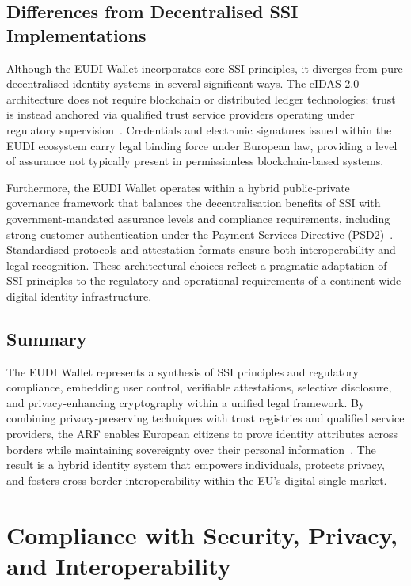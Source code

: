 \documentclass[sigconf,balance,nonacm,authordraft]{acmart}
\begin{document}
\subsection{Differences from Decentralised SSI Implementations}

Although the EUDI Wallet incorporates core SSI principles, it diverges from pure decentralised identity systems in several significant ways. The eIDAS 2.0 architecture does not require blockchain or distributed ledger technologies; trust is instead anchored via qualified trust service providers operating under regulatory supervision~\cite{Finextra_SSI_Differences}. Credentials and electronic signatures issued within the EUDI ecosystem carry legal binding force under European law, providing a level of assurance not typically present in permissionless blockchain-based systems.

Furthermore, the EUDI Wallet operates within a hybrid public-private governance framework that balances the decentralisation benefits of SSI with government-mandated assurance levels and compliance requirements, including strong customer authentication under the Payment Services Directive (PSD2)~\cite{Finextra_SSI_Differences}. Standardised protocols and attestation formats ensure both interoperability and legal recognition. These architectural choices reflect a pragmatic adaptation of SSI principles to the regulatory and operational requirements of a continent-wide digital identity infrastructure.

\subsection{Summary}

The EUDI Wallet represents a synthesis of SSI principles and regulatory compliance, embedding user control, verifiable attestations, selective disclosure, and privacy-enhancing cryptography within a unified legal framework. By combining privacy-preserving techniques with trust registries and qualified service providers, the ARF enables European citizens to prove identity attributes across borders while maintaining sovereignty over their personal information~\cite{EU_ARF2024,EU_eIDAS2024}. The result is a hybrid identity system that empowers individuals, protects privacy, and fosters cross-border interoperability within the EU's digital single market.
\section{Compliance with Security, Privacy, and Interoperability}
\label{sec:compliance}
\end{document}
